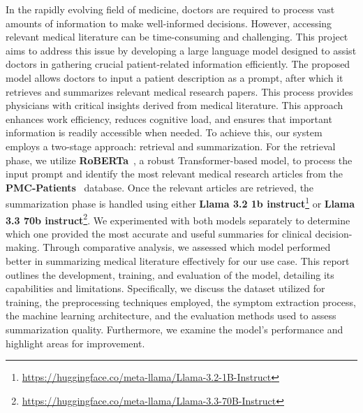 In the rapidly evolving field of medicine, doctors are required to process vast amounts of information to make well-informed decisions. However, accessing relevant medical literature can be time-consuming and challenging. This project aims to address this issue by developing a large language model designed to assist doctors in gathering crucial patient-related information efficiently.
The proposed model allows doctors to input a patient description as a prompt, after which it retrieves and summarizes relevant medical research papers. This process provides physicians with critical insights derived from medical literature. This approach enhances work efficiency, reduces cognitive load, and ensures that important information is readily accessible when needed.
To achieve this, our system employs a two-stage approach: retrieval and summarization. For the retrieval phase, we utilize \textbf{RoBERTa}~\cite{liu2019robertarobustlyoptimizedbert}, a robust Transformer-based model, to process the input prompt and identify the most relevant medical research articles from the \textbf{PMC-Patients}~\cite{Zhao_2023} database. 
Once the relevant articles are retrieved, the summarization phase is handled using either \textbf{Llama 3.2 1b instruct}\footnote{\url{https://huggingface.co/meta-llama/Llama-3.2-1B-Instruct}} or \textbf{Llama 3.3 70b instruct}\footnote{\url{https://huggingface.co/meta-llama/Llama-3.3-70B-Instruct}}. We experimented with both models separately to determine which one provided the most accurate and useful summaries for clinical decision-making. Through comparative analysis, we assessed which model performed better in summarizing medical literature effectively for our use case.
This report outlines the development, training, and evaluation of the model, detailing its capabilities and limitations. Specifically, we discuss the dataset utilized for training, the preprocessing techniques employed, the symptom extraction process, the machine learning architecture, and the evaluation methods used to assess summarization quality. Furthermore, we examine the model’s performance and highlight areas for improvement.